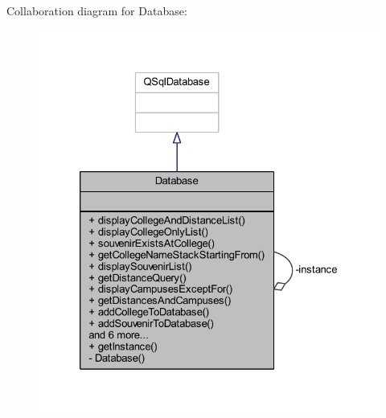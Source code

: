 Collaboration diagram for Database\+:
\nopagebreak
\begin{figure}[H]
\begin{center}
\leavevmode
\includegraphics[width=326pt]{class_database__coll__graph}
\end{center}
\end{figure}
